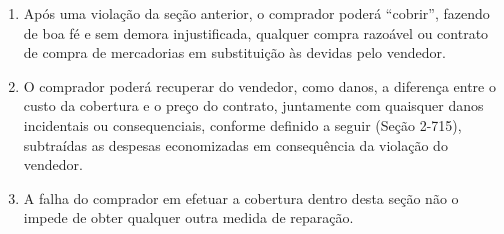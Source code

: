 \documentclass[a5paper,10pt]{book}
\begin{document}
\begin{enumerate}[label=(\arabic*)]
	\item Após uma violação da seção anterior, o comprador poderá ``cobrir'', fazendo de boa fé e sem demora injustificada, qualquer compra razoável ou contrato de compra de mercadorias em substituição às devidas pelo vendedor.
	\item O comprador poderá recuperar do vendedor, como danos, a diferença entre o custo da cobertura e o preço do contrato, juntamente com quaisquer danos incidentais ou consequenciais, conforme definido a seguir (Seção 2-715), subtraídas as despesas economizadas em consequência da violação do vendedor.
	\item A falha do comprador em efetuar a cobertura dentro desta seção não o impede de obter qualquer outra medida de reparação.
\end{enumerate}
\end{document}
